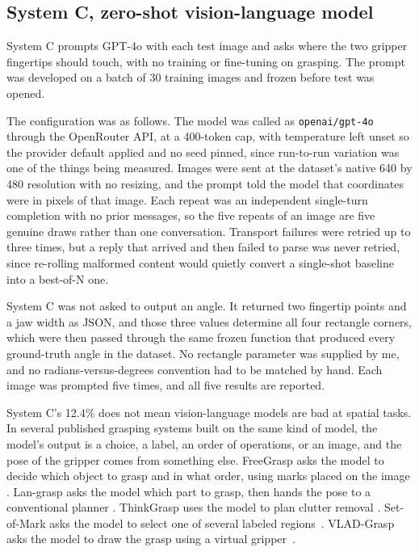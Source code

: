 \documentclass[12pt,letterpaper]{article}
\begin{document}
\subsection{System C, zero-shot vision-language model}

System C prompts GPT-4o with each test image and asks where the two
gripper fingertips should touch, with no training or fine-tuning on
grasping. The prompt was developed on a batch of 30 training images and
frozen before test was opened.

The configuration was as follows. The model was called as
\texttt{openai/gpt-4o} through the OpenRouter API, at a 400-token cap,
with temperature left unset so the provider default applied and no seed
pinned, since run-to-run variation was one of the things being
measured. Images were sent at the dataset's native 640 by 480
resolution with no resizing, and the prompt told the model that
coordinates were in pixels of that image. Each repeat was an
independent single-turn completion with no prior messages, so the five
repeats of an image are five genuine draws rather than one
conversation. Transport failures were retried up to three times, but a
reply that arrived and then failed to parse was never retried, since
re-rolling malformed content would quietly convert a single-shot
baseline into a best-of-N one.

System C was not asked to output an angle. It returned two fingertip
points and a jaw width as JSON, and those three values determine all
four rectangle corners, which were then passed through the same frozen
function that produced every ground-truth angle in the dataset. No
rectangle parameter was supplied by me, and no radians-versus-degrees
convention had to be matched by hand. Each image was prompted five
times, and all five results are reported.

System C's 12.4\% does not mean vision-language models are bad at
spatial tasks. In several published grasping systems built on the same
kind of model, the model's output is a choice, a label, an order of
operations, or an image, and the pose of the gripper comes from
something else. FreeGrasp asks the model to decide which object to
grasp and in what order, using marks placed on the image \cite{jiao2025}.
Lan-grasp asks the model which part to grasp, then hands the pose to a
conventional planner \cite{mirjalili2023}. ThinkGrasp uses the model to
plan clutter removal \cite{qian2024}. Set-of-Mark asks the model to
select one of several labeled regions~\cite{yang2024}. VLAD-Grasp asks
the model to draw the grasp using a virtual gripper~\cite{kulshrestha2025}.
\end{document}
